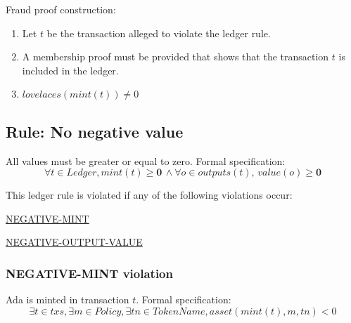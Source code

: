 \documentclass[../midgard.tex]{subfiles}
\begin{document}
Fraud proof construction:
\begin{enumerate}
  \item Let $t$ be the transaction alleged to violate the ledger rule.
  \item A membership proof must be provided that shows that the transaction $t$ is included in the ledger.
  \item $lovelaces(mint(t)) \neq 0$
\end{enumerate}




\subsection{Rule: No negative value}
\label{rule:no-negative-value}
All values must be greater or equal to zero.
Formal specification:
\begin{equation*}
    \forall t \in Ledger, mint(t) \geq \mathbf{0} \, \land \forall o \in outputs(t), \, value(o) \geq \mathbf{0}
\end{equation*}

This ledger rule is violated if any of the following violations occur:
\begin{itemize-multi}
  \item \hyperref[violation:NEGATIVE-MINT]{NEGATIVE-MINT}
  \item \hyperref[violation:NEGATIVE-OUTPUT-VALUE]{NEGATIVE-OUTPUT-VALUE}
\end{itemize-multi}

\subsubsection{NEGATIVE-MINT violation}
\label{violation:NEGATIVE-MINT}
Ada is minted in transaction $t$.
Formal specification:
\begin{equation*}
  \exists t \in txs, \exists m \in Policy, \exists tn \in TokenName, asset(mint(t), m, tn) < 0
\end{equation*}
\end{document}
